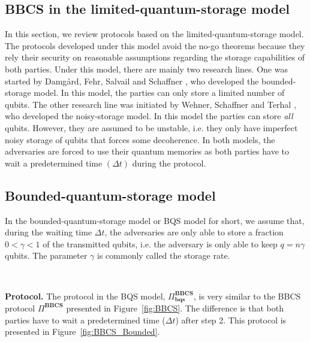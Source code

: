 \subsection{BBCS in the limited-quantum-storage model}

In this section, we review protocols based on the limited-quantum-storage model. The protocols developed under this model avoid the no-go theorems because they rely their security on reasonable assumptions regarding the storage capabilities of both parties. Under this model, there are mainly two research lines. One was started by Damg{\aa}rd, Fehr, Salvail and Schaffner \cite{DFSS05}, who developed the bounded-storage model. In this model, the parties can only store a limited number of qubits. The other research line was initiated by Wehner, Schaffner and Terhal \cite{WST08}, who developed the noisy-storage model. In this model the parties can store \textit{all} qubits. However, they are assumed to be unstable, i.e. they only have imperfect noisy storage of qubits that forces some decoherence. In both models, the adversaries are forced to use their quantum memories as both parties have to wait a predetermined time $(\Delta t)$ during the protocol.

\subsection{Bounded-quantum-storage model}

In the bounded-quantum-storage model or BQS model for short, we assume that, during the waiting time $\Delta t$, the adversaries are only able to store a fraction $0< \gamma < 1$ of the transmitted qubits, i.e. the adversary is only able to keep $q = n\gamma$ qubits. The parameter $\gamma$ is commonly called the storage rate.

\

\noindent\textbf{Protocol.} The protocol in the BQS model, $\Pi^{\textbf{BBCS}}_{\textbf{bqs}}$, is very similar to the BBCS protocol $\Pi^{\textbf{BBCS}}$ presented in Figure~\ref{fig:BBCS}. The difference is that both parties have to wait a predetermined time ($\Delta t$) after step 2. This protocol is presented in Figure~\ref{fig:BBCS_Bounded}.

